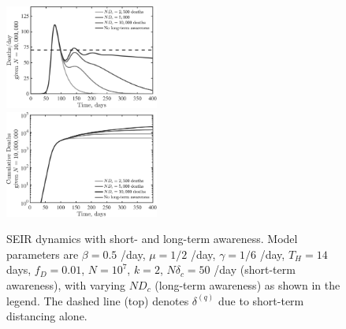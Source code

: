\begin{figure}[t!]
\begin{center}
\includegraphics[width=0.45\textwidth]{scripts/figseir_Hlong_k2D_noname.pdf}\\
\includegraphics[width=0.45\textwidth]{scripts/figseir_Hlong_k2Dtot_noname.pdf}\\
\caption{SEIR dynamics with short- and long-term awareness.
Model parameters are $\beta=0.5$ /day, $\mu=1/2$ /day, $\gamma=1/6$ /day,
$T_H=14$ days, $f_D=0.01$, $N=10^7$, $k=2$, $N\delta_c=50$ /day (short-term
awareness), with varying $ND_c$ (long-term awareness) as shown in the legend.
The dashed line (top) denotes $\delta^{(q)}$ due to short-term
distancing alone.
\label{fig.longterm}}
\end{center}
\end{figure}

